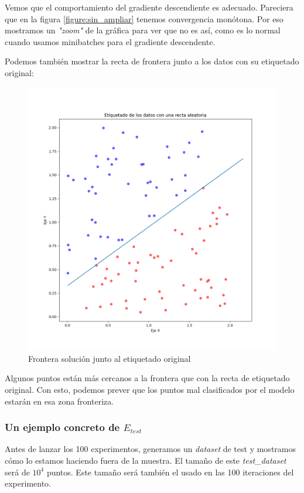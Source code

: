 \documentclass[11pt]{article}
\begin{document}
Vemos que el comportamiento del gradiente descendiente es adecuado. Pareciera que en la figura \ref{figure:sin_ampliar} tenemos convergencia monótona. Por eso mostramos un \emph{"zoom"} de la gráfica para ver que no es así, como es lo normal cuando usamos minibatches para el gradiente descendente.

Podemos también mostrar la recta de frontera junto a los datos con su etiquetado original:

\begin{figure}[H]
    \centering
    \includegraphics[scale=0.35]{frontera_resultado_lgr}
    \caption{Frontera solución junto al etiquetado original}
\end{figure}

Algunos puntos están más cercanos a la frontera que con la recta de etiquetado original. Con esto, podemos prever que los puntos mal clasificados por el modelo estarán en esa zona fronteriza.

\subsubsection{Un ejemplo concreto de $E_{test}$}

Antes de lanzar los 100 experimentos, generamos un \emph{dataset} de test y mostramos cómo lo estamos haciendo fuera de la muestra. El tamaño de este \emph{test\_dataset} será de $10^4$ puntos. Este tamaño será también el usado en las 100 iteraciones del experimento.
\end{document}
